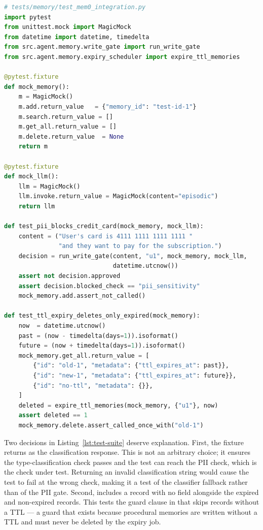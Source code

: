 \begin{lstlisting}[language=Python,
  caption={mock\_memory fixture and two representative policy tests},
  label={lst:test-suite}]
# tests/memory/test_mem0_integration.py
import pytest
from unittest.mock import MagicMock
from datetime import datetime, timedelta
from src.agent.memory.write_gate import run_write_gate
from src.agent.memory.expiry_scheduler import expire_ttl_memories

@pytest.fixture
def mock_memory():
    m = MagicMock()
    m.add.return_value   = {"memory_id": "test-id-1"}
    m.search.return_value = []
    m.get_all.return_value = []
    m.delete.return_value  = None
    return m

@pytest.fixture
def mock_llm():
    llm = MagicMock()
    llm.invoke.return_value = MagicMock(content="episodic")
    return llm

def test_pii_blocks_credit_card(mock_memory, mock_llm):
    content = ("User's card is 4111 1111 1111 1111 "
               "and they want to pay for the subscription.")
    decision = run_write_gate(content, "u1", mock_memory, mock_llm,
                              datetime.utcnow())
    assert not decision.approved
    assert decision.blocked_check == "pii_sensitivity"
    mock_memory.add.assert_not_called()

def test_ttl_expiry_deletes_only_expired(mock_memory):
    now  = datetime.utcnow()
    past = (now - timedelta(days=1)).isoformat()
    future = (now + timedelta(days=1)).isoformat()
    mock_memory.get_all.return_value = [
        {"id": "old-1", "metadata": {"ttl_expires_at": past}},
        {"id": "new-1", "metadata": {"ttl_expires_at": future}},
        {"id": "no-ttl", "metadata": {}},
    ]
    deleted = expire_ttl_memories(mock_memory, {"u1"}, now)
    assert deleted == 1
    mock_memory.delete.assert_called_once_with("old-1")
\end{lstlisting}

Two decisions in Listing~\ref{lst:test-suite} deserve explanation. First, the
 fixture returns  as the classification
response. This is not an arbitrary choice; it ensures the type-classification
check passes and the test can reach the PII check, which is the check under
test. Returning an invalid classification string would cause the test to fail
at the wrong check, making it a test of the classifier fallback rather than of
the PII gate. Second,  includes
a record with no  field alongside the expired and
non-expired records. This tests the guard clause in 
that skips records without a TTL --- a guard that exists because procedural
memories are written without a TTL and must never be deleted by the expiry
job.

